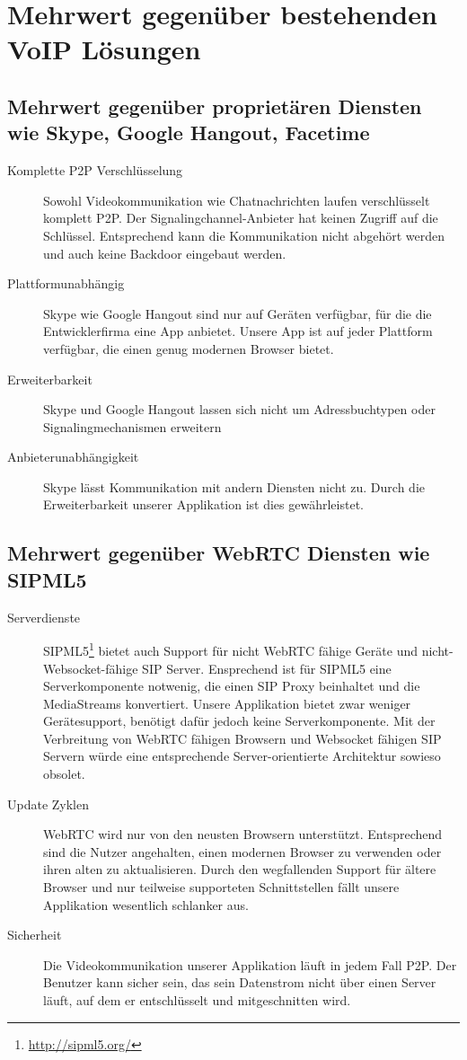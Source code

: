 		
	\section{Mehrwert gegenüber bestehenden VoIP Lösungen}
		\subsection{Mehrwert gegenüber proprietären Diensten wie Skype, Google Hangout, Facetime}
			\begin{description}
				\item[Komplette P2P Verschlüsselung] Sowohl Videokommunikation wie Chatnachrichten laufen verschlüsselt komplett P2P. Der Signalingchannel-Anbieter hat keinen Zugriff auf die Schlüssel. Entsprechend kann die Kommunikation nicht abgehört werden und auch keine Backdoor eingebaut werden.
				\item[Plattformunabhängig] Skype wie Google Hangout sind nur auf Geräten verfügbar, für die die Entwicklerfirma eine App anbietet. Unsere App ist auf jeder Plattform verfügbar, die einen genug modernen Browser bietet.
				\item[Erweiterbarkeit] Skype und Google Hangout lassen sich nicht um Adressbuchtypen oder Signalingmechanismen erweitern
				\item[Anbieterunabhängigkeit] Skype lässt Kommunikation mit andern Diensten nicht zu. Durch die Erweiterbarkeit unserer Applikation ist dies gewährleistet.
			\end{description}
		\subsection{Mehrwert gegenüber WebRTC Diensten wie SIPML5}
			\begin{description}
				\item[Serverdienste] SIPML5\footnote{\hyperlink{http://sipml5.org/}{http://sipml5.org/}} bietet auch Support für nicht WebRTC fähige Geräte und nicht-Websocket-fähige SIP Server. Ensprechend ist für SIPML5 eine Serverkomponente notwenig, die einen SIP Proxy beinhaltet und die MediaStreams konvertiert. Unsere Applikation bietet zwar weniger Gerätesupport, benötigt dafür jedoch keine Serverkomponente. Mit der Verbreitung von WebRTC fähigen Browsern und Websocket fähigen SIP Servern würde eine entsprechende Server-orientierte Architektur sowieso obsolet.
				\item[Update Zyklen] WebRTC wird nur von den neusten Browsern unterstützt. Entsprechend sind die Nutzer angehalten, einen modernen Browser zu verwenden oder ihren alten zu aktualisieren. Durch den wegfallenden Support für ältere Browser und nur teilweise supporteten Schnittstellen fällt unsere Applikation wesentlich schlanker aus.
				\item[Sicherheit] Die Videokommunikation unserer Applikation läuft in jedem Fall P2P. Der Benutzer kann sicher sein, das sein Datenstrom nicht über einen Server läuft, auf dem er entschlüsselt und mitgeschnitten wird.
			\end{description}
